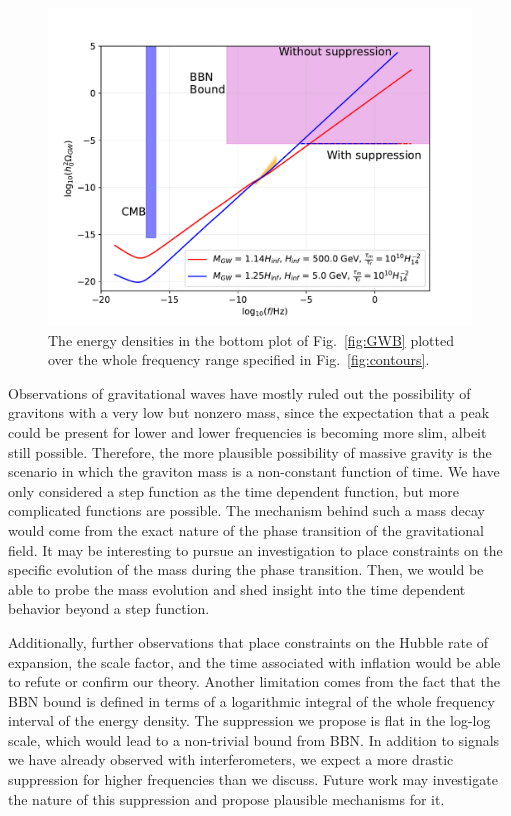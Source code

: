 \documentclass[prd,twocolumn,aps,psfig,nofootinbib,nobibnotes,superscriptaddress,preprintnumbers,times]{revtex4-2}
\begin{document}
\begin{figure}[h]
\includegraphics[width=\linewidth]{fig/fig7.pdf}
\caption{The energy densities in the bottom plot of Fig.\ \ref{fig:GWB} plotted over the whole frequency range specified in Fig.\ \ref{fig:contours}.}
\label{fig:supp}
\end{figure}

Observations of gravitational waves have mostly ruled out the possibility of gravitons with a very low but nonzero mass, since the expectation that a peak could be present for lower and lower frequencies is becoming more slim, albeit still possible. Therefore, the more plausible possibility of massive gravity is the scenario in which the graviton mass is a non-constant function of time. We have only considered a step function as the time dependent function, but more complicated functions are possible. The mechanism behind such a mass decay would come from the exact nature of the phase transition of the gravitational field. It may be interesting to pursue an investigation to place constraints on the specific evolution of the mass during the phase transition. Then, we would be able to probe the mass evolution and shed insight into the time dependent behavior beyond a step function. 

Additionally, further observations that place constraints on the Hubble rate of expansion, the scale factor, and the time associated with inflation would be able to refute or confirm our theory. Another limitation comes from the fact that the BBN bound is defined in terms of a logarithmic integral of the whole frequency interval of the energy density. The suppression we propose is flat in the log-log scale, which would lead to a non-trivial bound from BBN. In addition to signals we have already observed with interferometers, we expect a more drastic suppression for higher frequencies than we discuss. Future work may investigate the nature of this suppression and propose plausible mechanisms for it.
\end{document}
